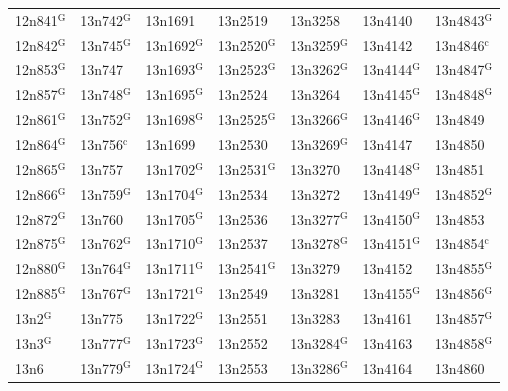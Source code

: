 \documentclass[12pt, oneside]{amsart}
\begin{document}
{\begin{longtable}{*{7}{>{\raggedright\arraybackslash}p{}}}
12n841$^{\mathrm{G}}$ & 13n742$^{\mathrm{G}}$ & 13n1691 & 13n2519 & 13n3258 & 13n4140 & 13n4843$^{\mathrm{G}}$ \\
12n842$^{\mathrm{G}}$ & 13n745$^{\mathrm{G}}$ & 13n1692$^{\mathrm{G}}$ & 13n2520$^{\mathrm{G}}$ & 13n3259$^{\mathrm{G}}$ & 13n4142 & 13n4846$^{\mathrm{c}}$ \\
12n853$^{\mathrm{G}}$ & 13n747 & 13n1693$^{\mathrm{G}}$ & 13n2523$^{\mathrm{G}}$ & 13n3262$^{\mathrm{G}}$ & 13n4144$^{\mathrm{G}}$ & 13n4847$^{\mathrm{G}}$ \\
12n857$^{\mathrm{G}}$ & 13n748$^{\mathrm{G}}$ & 13n1695$^{\mathrm{G}}$ & 13n2524 & 13n3264 & 13n4145$^{\mathrm{G}}$ & 13n4848$^{\mathrm{G}}$ \\
12n861$^{\mathrm{G}}$ & 13n752$^{\mathrm{G}}$ & 13n1698$^{\mathrm{G}}$ & 13n2525$^{\mathrm{G}}$ & 13n3266$^{\mathrm{G}}$ & 13n4146$^{\mathrm{G}}$ & 13n4849 \\
12n864$^{\mathrm{G}}$ & 13n756$^{\mathrm{c}}$ & 13n1699 & 13n2530 & 13n3269$^{\mathrm{G}}$ & 13n4147 & 13n4850 \\
12n865$^{\mathrm{G}}$ & 13n757 & 13n1702$^{\mathrm{G}}$ & 13n2531$^{\mathrm{G}}$ & 13n3270 & 13n4148$^{\mathrm{G}}$ & 13n4851 \\
12n866$^{\mathrm{G}}$ & 13n759$^{\mathrm{G}}$ & 13n1704$^{\mathrm{G}}$ & 13n2534 & 13n3272 & 13n4149$^{\mathrm{G}}$ & 13n4852$^{\mathrm{G}}$ \\
12n872$^{\mathrm{G}}$ & 13n760 & 13n1705$^{\mathrm{G}}$ & 13n2536 & 13n3277$^{\mathrm{G}}$ & 13n4150$^{\mathrm{G}}$ & 13n4853 \\
12n875$^{\mathrm{G}}$ & 13n762$^{\mathrm{G}}$ & 13n1710$^{\mathrm{G}}$ & 13n2537 & 13n3278$^{\mathrm{G}}$ & 13n4151$^{\mathrm{G}}$ & 13n4854$^{\mathrm{c}}$ \\
12n880$^{\mathrm{G}}$ & 13n764$^{\mathrm{G}}$ & 13n1711$^{\mathrm{G}}$ & 13n2541$^{\mathrm{G}}$ & 13n3279 & 13n4152 & 13n4855$^{\mathrm{G}}$ \\
12n885$^{\mathrm{G}}$ & 13n767$^{\mathrm{G}}$ & 13n1721$^{\mathrm{G}}$ & 13n2549 & 13n3281 & 13n4155$^{\mathrm{G}}$ & 13n4856$^{\mathrm{G}}$ \\
13n2$^{\mathrm{G}}$ & 13n775 & 13n1722$^{\mathrm{G}}$ & 13n2551 & 13n3283 & 13n4161 & 13n4857$^{\mathrm{G}}$ \\
13n3$^{\mathrm{G}}$ & 13n777$^{\mathrm{G}}$ & 13n1723$^{\mathrm{G}}$ & 13n2552 & 13n3284$^{\mathrm{G}}$ & 13n4163 & 13n4858$^{\mathrm{G}}$ \\
13n6 & 13n779$^{\mathrm{G}}$ & 13n1724$^{\mathrm{G}}$ & 13n2553 & 13n3286$^{\mathrm{G}}$ & 13n4164 & 13n4860 \\

\end{longtable}}
\end{document}
